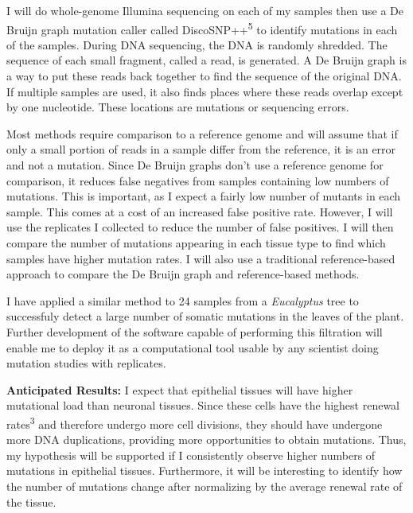 \documentclass[12pt]{article}
\begin{document}
I will do whole-genome Illumina sequencing on each of my samples then use a De Bruijn graph mutation caller called DiscoSNP++\textsuperscript{5} to identify mutations in each of the samples. During DNA sequencing, the DNA is randomly shredded. The sequence of each small fragment, called a read, is generated. A De Bruijn graph is a way to put these reads back together to find the sequence of the original DNA. If multiple samples are used, it also finds places where these reads overlap except by one nucleotide. These locations are mutations or sequencing errors.

Most methods require comparison to a reference genome and will assume that if only a small portion of reads in a sample differ from the reference, it is an error and not a mutation. Since De Bruijn graphs don't use a reference genome for comparison, it reduces false negatives from samples containing low numbers of mutations. This is important, as I expect a fairly low number of mutants in each sample. This comes at a cost of an increased false positive rate. However, I will use the replicates I collected to reduce the number of false positives. I will then compare the number of mutations appearing in each tissue type to find which samples have higher mutation rates. I will also use a traditional reference-based approach to compare the De Bruijn graph and reference-based methods.

I have applied a similar method to 24 samples from a \textit{Eucalyptus} tree to successfuly detect a large number of somatic mutations in the leaves of the plant. Further development of the software capable of performing this filtration will enable me to deploy it as a computational tool usable by any scientist doing mutation studies with replicates.

\textbf{Anticipated Results:}
I expect that epithelial tissues will have higher mutational load than neuronal tissues. Since these cells have the highest renewal rates\textsuperscript{3} and therefore undergo more cell divisions, they should have undergone more DNA duplications, providing more opportunities to obtain mutations.
Thus, my hypothesis will be supported if I consistently observe higher numbers of mutations in epithelial tissues. Furthermore, it will be interesting to identify how the number of mutations change after normalizing by the average renewal rate of the tissue.  

\end{document}
